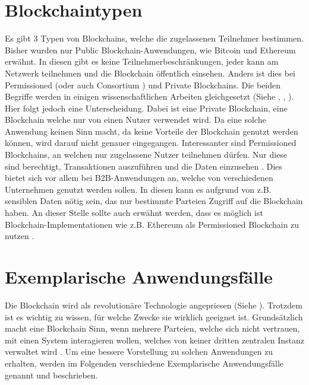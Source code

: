 \section{Blockchaintypen}
Es gibt 3 Typen von Blockchains, welche die zugelassenen Teilnehmer bestimmen. Bisher wurden nur Public Blockchain-Anwendungen, wie Bitcoin und Ethereum erwähnt. In diesen gibt es keine Teilnehmerbeschränkungen, jeder kann am Netzwerk teilnehmen und die Blockchain öffentlich einsehen. Anders ist dies bei Permissioned (oder auch Consortium \cite{BenHamidaBlockchainEnterpriseOverview2017}) und Private Blockchains. Die beiden Begriffe werden in einigen wissenschaftlichen Arbeiten gleichgesetzt (Siehe \cite{Gramolidangerprivateblockchains2016}, \cite{PongnumkulPerformanceAnalysisPrivate2017a}, \cite{LiScalablePrivateIndustrial2017}). Hier folgt jedoch eine Unterscheidung. Dabei ist eine Private Blockchain, eine Blockchain welche nur von einen Nutzer verwendet wird. Da eine solche Anwendung keinen Sinn macht, da keine Vorteile der Blockchain genutzt werden können, wird darauf nicht genauer eingegangen. Interessanter sind Permissioned Blockchains, an welchen nur zugelassene Nutzer teilnehmen dürfen. Nur diese sind berechtigt, Transaktionen auszuführen und die Daten einzusehen \cite{LiScalablePrivateIndustrial2017}. Dies bietet sich vor allem bei B2B-Anwendungen an, welche von verschiedenen Unternehmen genutzt werden sollen. In diesen kann es aufgrund von z.B. sensiblen Daten nötig sein, das nur bestimmte Parteien Zugriff auf die Blockchain haben.
An dieser Stelle sollte auch erwähnt werden, dass es möglich ist Blockchain-Implementationen wie z.B. Ethereum als Permissioned Blockchain zu nutzen \cite{MercuryProtocolHowCreateYour2017}.

\label{subsec:use-cases}
\section{Exemplarische Anwendungsfälle}
Die Blockchain wird als revolutionäre Technologie angepriesen (Siehe \cite{TapscottBlockchainRevolutionWieTechnologie2016}). Trotzdem ist es wichtig zu wissen, für welche Zwecke sie wirklich geeignet ist. Grundsätzlich macht eine Blockchain Sinn, wenn mehrere Parteien, welche sich nicht vertrauen, mit einen System interagieren wollen, welches von keiner dritten zentralen Instanz verwaltet wird \cite{WustyouneedBlockchain2017}. Um eine bessere Vorstellung zu solchen Anwendungen zu erhalten, werden im Folgenden verschiedene Exemplarische Anwendungsfälle genannt und beschrieben.

